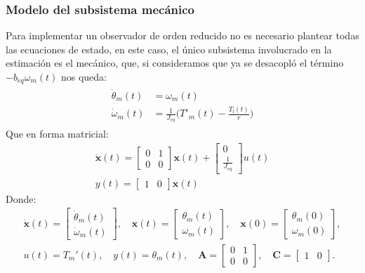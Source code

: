 \documentclass[12pt, a4paper,journal, onecolumn, compsoc]{IEEEtran}
\begin{document}
\subsubsection{Modelo del subsistema mecánico}
Para implementar un observador de orden reducido no es necesario plantear todas las ecuaciones de estado, en este caso, el único subsistema involucrado en la estimación es el mecánico, que, si consideramos que ya se desacopló el término $-b_{eq}\omega_m(t)$ nos queda:
\begin{gather}
\begin{aligned}
    \dot\theta_m(t) &= \omega_m(t) \\
    \dot \omega_m(t) &= \frac{1}{J_{eq}}\Big(T'_m(t)-\frac{T_l(t)}{r}\Big)
\end{aligned}
\end{gather}
Que en forma matricial:
\begin{gather*}
    \bm{\dot x}(t)
=
\begin{bmatrix}
    0 & 1 \\ 0 & 0
\end{bmatrix}
\bm{x}(t)
+
\begin{bmatrix}
    0 \\ \frac{1}{J_{eq}} 
\end{bmatrix}
    u(t)
\\
y(t) =
\begin{bmatrix}
    1 & 0
\end{bmatrix}
\bm{x}(t)
\end{gather*}
Donde:
\begin{gather*}
\bm{\dot x}(t)=
\begin{bmatrix}
    \dot\theta_m(t) \\ \dot\omega_m(t)
\end{bmatrix},
\quad
\bm{x}(t)=
\begin{bmatrix}
    \theta_m(t) \\ \omega_m(t)
\end{bmatrix},
\quad
\bm{x}(0)=
\begin{bmatrix}
    \theta_m(0) \\ \omega_m(0)
\end{bmatrix}, \\[6pt]
u(t)=T_m'(t),
\quad
y(t)=\theta_m(t),
\quad
\bm{A}=\begin{bmatrix}
    0 & 1\\ 0 & 0
\end{bmatrix},
\quad
\bm{C}=\begin{bmatrix}
    1 & 0
\end{bmatrix}.
\end{gather*}
    
\end{document}
